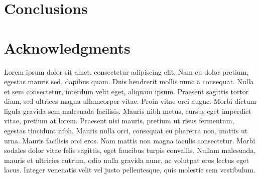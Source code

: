 \documentclass[paper,twocolumn,twoside]{geophysics}
\begin{document}
\section{Conclusions}

\section{Acknowledgments}

Lorem ipsum dolor sit amet, consectetur adipiscing elit. Nam eu dolor pretium,
egestas mauris sed, dapibus quam. Duis hendrerit mollis nunc a consequat. Nulla
et sem consectetur, interdum velit eget, aliquam ipsum. Praesent sagittis
tortor diam, sed ultrices magna ullamcorper vitae. Proin vitae orci augue.
Morbi dictum ligula gravida sem malesuada facilisis. Mauris nibh metus, cursus
eget imperdiet vitae, pretium at lorem. Praesent nisi mauris, pretium ut risus
fermentum, egestas tincidunt nibh. Mauris nulla orci, consequat eu pharetra
non, mattis ut urna. Mauris facilisis orci eros. Nam mattis non magna iaculis
consectetur. Morbi sodales dolor vitae felis sagittis, eget faucibus turpis
convallis. Nullam malesuada, mauris et ultricies rutrum, odio nulla gravida
nunc, ac volutpat eros lectus eget lacus. Integer venenatis velit vel justo
pellentesque, quis molestie sem vestibulum.



\end{document}
